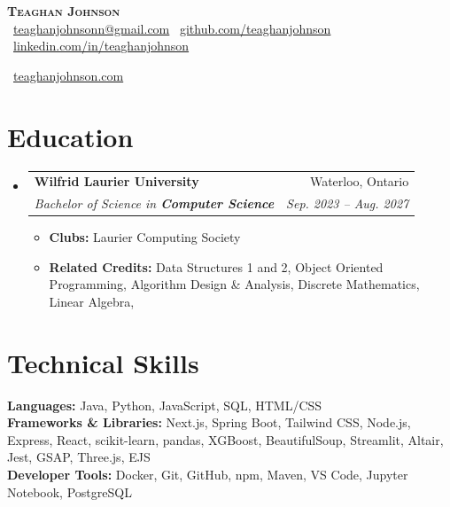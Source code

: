 \documentclass[letterpaper,11pt]{article}
\makeatletter
\newcommand{\resumeItem}[1]{
  \item\small{{#1 \vspace{-2pt}}}
}
\newcommand{\resumeSubheading}[4]{
  \vspace{-2pt}\item
    \begin{tabular*}{0.97\textwidth}[t]{l@{\extracolsep{\fill}}r}
      \textbf{#1} & #2 \\
      \textit{\small #3} & \textit{\small #4} \\
    \end{tabular*}\vspace{-7pt}
}
\newcommand{\resumeSubHeadingListStart}{\begin{itemize}[leftmargin=0.15in, label={}]}
\newcommand{\resumeSubHeadingListEnd}{\end{itemize}}
\newcommand{\resumeItemListStart}{\begin{itemize}}
\newcommand{\resumeItemListEnd}{\end{itemize}\vspace{-5pt}}
\makeatother
\begin{document}
\begin{center}
    \textbf{\Huge \scshape Teaghan Johnson} \\ \vspace{8pt}
    \small
    \faEnvelope\ \href{mailto:teaghanjohnsonn@gmail.com}{teaghanjohnsonn@gmail.com} \quad
    \faGithub\ \href{https://github.com/teaghanjohnson}{github.com/teaghanjohnson} \quad
    \faLinkedin\ \href{https://www.linkedin.com/in/teaghan-johnson-510b95324/}{linkedin.com/in/teaghanjohnson} \quad

    \faGlobe\ \href{https://teaghanjohnson.com}{teaghanjohnson.com}
\end{center}
\section{Education}
\resumeSubHeadingListStart
  \resumeSubheading
    {Wilfrid Laurier University}{Waterloo, Ontario}
    {Bachelor of Science in \textbf{Computer Science}}{Sep. 2023 -- Aug. 2027}
  \resumeItemListStart
    \resumeItem{\textbf{Clubs:} Laurier Computing Society}
    \resumeItem{\textbf{Related Credits: }Data Structures 1 and 2, Object Oriented Programming, Algorithm Design \& Analysis, Discrete Mathematics, Linear Algebra, }
  \resumeItemListEnd
\resumeSubHeadingListEnd
\section{Technical Skills}
\small{
\textbf{Languages:} Java, Python, JavaScript, SQL, HTML/CSS \\[2pt]
\textbf{Frameworks \& Libraries:} Next.js, Spring Boot, Tailwind CSS, Node.js, Express, React, scikit-learn, pandas, XGBoost, BeautifulSoup, Streamlit, Altair, Jest, GSAP, Three.js, EJS \\[2pt]
\textbf{Developer Tools:} Docker, Git, GitHub, npm, Maven, VS Code, Jupyter Notebook, PostgreSQL
}
\end{document}
